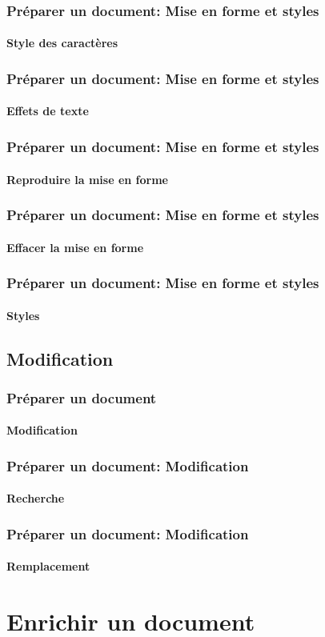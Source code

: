 \documentclass[xcolor=table]{beamer}
\begin{document}
\begin{frame}
\frametitle{Préparer un document: Mise en forme et styles}
\framesubtitle{Style des caractères}

\end{frame}

\begin{frame}
\frametitle{Préparer un document: Mise en forme et styles}
\framesubtitle{Effets de texte}

\end{frame}

\begin{frame}
\frametitle{Préparer un document: Mise en forme et styles}
\framesubtitle{Reproduire la mise en forme}

\end{frame}

\begin{frame}
\frametitle{Préparer un document: Mise en forme et styles}
\framesubtitle{Effacer la mise en forme}

\end{frame}

\begin{frame}
\frametitle{Préparer un document: Mise en forme et styles}
\framesubtitle{Styles}

\end{frame}

\subsection{Modification}%

\begin{frame}
\frametitle{Préparer un document}
\framesubtitle{Modification}

\end{frame}

\begin{frame}
\frametitle{Préparer un document: Modification}
\framesubtitle{Recherche}

\end{frame}

\begin{frame}
\frametitle{Préparer un document: Modification}
\framesubtitle{Remplacement}

\end{frame}

\section{Enrichir un document}
\end{document}
